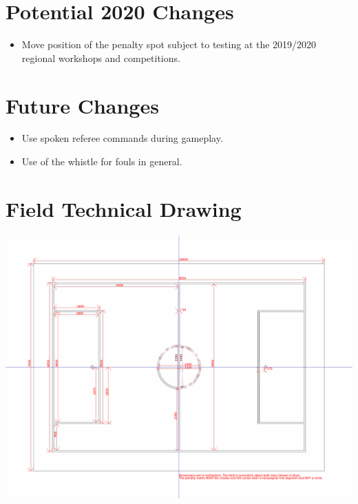 \documentclass[12pt]{article}
\begin{document}
\section{Potential 2020 Changes}
\begin{itemize}
  \item Move position of the penalty spot subject to testing at the 2019/2020 regional workshops and competitions.
\end{itemize}

\section{Future Changes}
\label{sec:future_changes}
\begin{itemize}
  \item Use spoken referee commands during gameplay.
  \item Use of the whistle for fouls in general.
\end{itemize}

\section{Field Technical Drawing}
\label{apx:technical-drawing}
\centerline{\includegraphics[angle=90,origin=c,width=\columnwidth]{figs/fieldDimensions2020_technical.pdf}}

\end{document}
